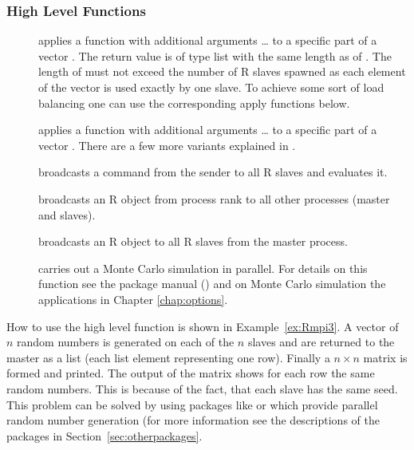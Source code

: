 \subsubsection{High Level Functions}
\begin{description}
\item[] applies a function
   with additional arguments \ldots{} to a specific part of
  a vector . The return value is of type list with the same
  length as of . The length of
   must not exceed the 
  number of R slaves spawned as each element of the vector is used
  exactly by one slave. To achieve some sort of load balancing one can 
  use the corresponding apply functions below.
\item[] applies a function
   with additional arguments \ldots{} to a specific part of
  a vector . There are a few more variants explained in
  \cite{yu06Rmpi}.
\item[]
  broadcasts a command  from the sender  to
  all R slaves and evaluates it.
\item[]
  broadcasts an R object  from process rank 
  to all other processes (master and slaves).
\item[] broadcasts an R
  object  to all R slaves from the master process. 
\item[] carries out a Monte Carlo simulation
  in parallel. For details on this function see the package manual
  (\cite{yu06Rmpi}) and on Monte Carlo simulation
  the applications in Chapter \ref{chap:options}.
\end{description}

How to use the high level function  is shown in
Example~\ref{ex:Rmpi3}. A vector of $n$ random numbers is generated on
each of the $n$ slaves and are returned to the master as a
list (each list element representing one row). Finally a $n  \times n$
matrix is formed and printed. The output of the matrix shows for each
row the same random numbers. This is because of the fact, that each
slave has the same seed. This problem can be solved by using packages
like   or  which provide parallel random number
generation (for more information see the descriptions of the packages
in Section~\ref{sec:otherpackages}.

